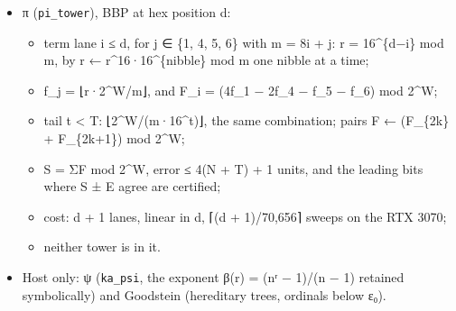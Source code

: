 \begin{itemize}
\begin{itemize}
\begin{itemize}
\item phase one, a thread a term: find the leftmost outermost redex (λM)N; a normal form settles;
\item phase two: each reduct token is a plan (depth D, bound k, body, argument) gathered from its source token by the index. The record program computes (λM)N → M[N], with a body variable i > D + 1 ↦ i − 1, an argument variable i > k ↦ i + D, and every other token copied. It is imprinted at the round's widths;
\item phase three: the same decisions as \texttt{omega\_\allowbreak{}run}, namely halt at a normal form, loop by Brent's watcher, grows forever by the spine proof;
\item settled terms leave as one record; retained terms move into the next round's rooms;
\item a job (≤ 2\textasciicircum{}22 terms of one length) is admitted once fewer than 2\textasciicircum{}21 are live;
\item a term the device cannot hold is parked as outgrown, and a stop leaves the live terms open;
\item the run is one tessera job.
\end{itemize}
\end{itemize}
\item π (\texttt{pi\_\allowbreak{}tower}), BBP at hex position d:

\begin{itemize}
\item term lane i ≤ d, for j ∈ \{1, 4, 5, 6\} with m = 8i + j: r = 16\textasciicircum{}\{d−i\} mod m, by r ← r\textasciicircum{}16·16\textasciicircum{}\{nibble\} mod m one nibble at a time;
\item f\_\allowbreak{}j = ⌊r·2\textasciicircum{}W/m⌋, and F\_\allowbreak{}i = (4f\_\allowbreak{}1 − 2f\_\allowbreak{}4 − f\_\allowbreak{}5 − f\_\allowbreak{}6) mod 2\textasciicircum{}W;
\item tail t < T: ⌊2\textasciicircum{}W/(m·16\textasciicircum{}t)⌋, the same combination; pairs F ← (F\_\allowbreak{}\{2k\} + F\_\allowbreak{}\{2k+1\}) mod 2\textasciicircum{}W;
\item S = ΣF mod 2\textasciicircum{}W, error ≤ 4(N + T) + 1 units, and the leading bits where S ± E agree are certified;
\item cost: d + 1 lanes, linear in d, ⌈(d + 1)/70,656⌉ sweeps on the RTX 3070;
\item neither tower is in it.
\end{itemize}
\item Host only: ψ (\texttt{ka\_\allowbreak{}psi}, the exponent β(r) = (nʳ − 1)/(n − 1) retained symbolically) and Goodstein (hereditary trees, ordinals below ε₀).
\end{itemize}

